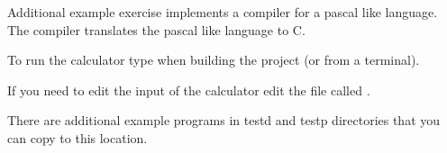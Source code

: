 Additional example exercise implements a compiler for a pascal like language.
The compiler translates the pascal like language to C.

To run the calculator type  when building the project (or  from a terminal).

If you need to edit the input of the calculator edit the file called .

There are additional example programs in testd and testp directories that you
can copy to this location.
